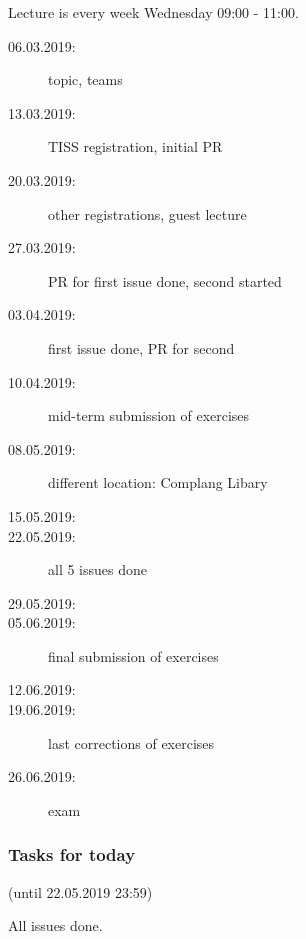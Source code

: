 


\date{22.05.2018}



\renewcommand{\enquote}[1]{\emph{``#1''}} %

\begin{frame}
	\titlepage
	\doclicenseThis
\end{frame}

\begin{frame}
	Lecture is every week Wednesday 09:00 - 11:00.

	\begin{description}
		\item[06.03.2019:] {\color{gray}topic, teams}
		\item[13.03.2019:] {\color{gray}TISS registration, initial PR}
		\item[20.03.2019:] {\color{gray}other registrations, guest lecture}
		\item[27.03.2019:] {\color{gray}PR for first issue done, second started}
		\item[03.04.2019:] {\color{gray}first issue done, PR for second}
		\item[10.04.2019:] {\color{gray}mid-term submission of exercises}
		\item[08.05.2019:] {\color{gray}different location: Complang Libary}
		\item[15.05.2019:]
		\item[22.05.2019:] {\color{red}all 5 issues done}
		\item[29.05.2019:]
		\item[05.06.2019:] final submission of exercises
		\item[12.06.2019:]
		\item[19.06.2019:] last corrections of exercises
		\item[26.06.2019:] exam
	\end{description}
\end{frame}

\begin{assignment}
	\frametitle{Tasks for today}
	(until 22.05.2019 23:59)

	\begin{task}
	All issues done.
	\end{task}
\end{assignment}

